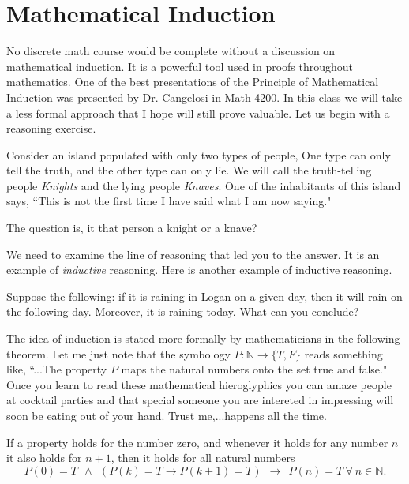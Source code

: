 \section{Mathematical Induction}

No discrete math course would be complete without a discussion on mathematical induction.  It is a powerful tool used in proofs throughout mathematics.  One of the best presentations of the Principle of Mathematical Induction was presented by Dr. Cangelosi in Math 4200.  In this class we will take a less formal approach that I hope will still prove valuable.  Let us begin with a reasoning exercise.

\begin{problem}
Consider an island populated with only two types of people,  One type can only tell the truth, and the other type can only lie.  We will call the truth-telling people \emph{Knights} and the lying people \emph{Knaves}.  One of the inhabitants of this island says, ``This is not the first time I have said what I am now saying."

The question is, it that person a knight or a knave?


\end{problem}
We need to examine the line of reasoning that led you to the answer.  It is an example of \emph{inductive} reasoning.  Here is another example of inductive reasoning.
\begin{example}
Suppose the following: if it is raining in Logan on a given day, then it will rain on the following day.  Moreover, it is raining today.  What can you conclude?
\end{example}

\newpage
The idea of induction is stated more formally by mathematicians in the following theorem.  Let me just note that the symbology $P: \mathbb{N}\to \{T, F \}$ reads something like, ``...The property $P$ maps the natural numbers onto the set true and false."  Once you learn to read these mathematical hieroglyphics you can amaze people at cocktail parties and that special someone you are intereted in impressing will soon be eating out of your hand.  Trust me,...happens all the time.
\begin{theorem} 
If a property holds for the number zero, and \underline{whenever} it holds for any number $n$  it also holds for $n+1$, then it holds for all natural numbers
$$ P(0) = T ~~\land~~ (P(k) = T\to P(k+1) = T) ~~\to ~~P(n) = T ~\forall~ n\in\mathbb{N}.$$

%
%
%
\label{pmi}
\end{theorem}


